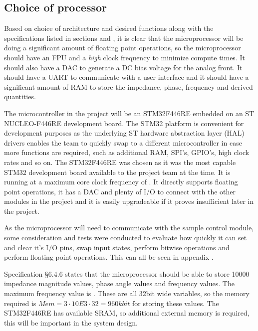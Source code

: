 \subsection{Choice of processor} \label{subsec:MainProcessorChoice}

Based on choice of architecture and desired functions along with the specifications listed in sections  and , it is clear that the microprocessor will be doing a significant amount of floating point operations, so the microprocessor should have an FPU and a \textit{high} clock frequency to minimize compute times. It should also have a DAC to generate a DC bias voltage for the analog front. It should have a UART to communicate with a user interface and it should have a significant amount of RAM to store the impedance, phase, frequency and derived quantities. 

The microcontroller in the project will be an STM32F446RE\cite{ST_STM32F446RE} embedded on an ST NUCLEO-F446RE\cite{ST_NUCLEOF446RE} development board. The STM32 platform is convenient for development purposes as the underlying ST hardware abstraction layer (HAL) drivers enables the team to quickly swap to a different microcontroller in case more functions are required, such as additional RAM, SPI's, GPIO's, high clock rates and so on. The STM32F446RE was chosen as it was the most capable STM32 development board available to the project team at the time. It is running at a maximum core clock frequency of . It directly supports floating point operations, it has a DAC and plenty of I/O to connect with the other modules in the project and it is easily upgradeable if it proves insufficient later in the project.

As the microprocessor will need to communicate with the sample control module, some consideration and tests were conducted  to evaluate how quickly it can set and clear it's I/O pins, swap input states, perform bitwise operations and perform floating point operations. This can all be seen in appendix .

Specification §6.4.6 states that the microprocessor should be able to store 10000 impedance magnitude values, phase angle values and frequency values. The maximum frequency value is . These are all 32bit wide variables, so the memory required is $Mem = 3\cdot 10E3 \cdot 32 = 960 kbit$ for storing these values. The STM32F446RE has  available SRAM, so additional external memory is required, this will be important in the system design.


